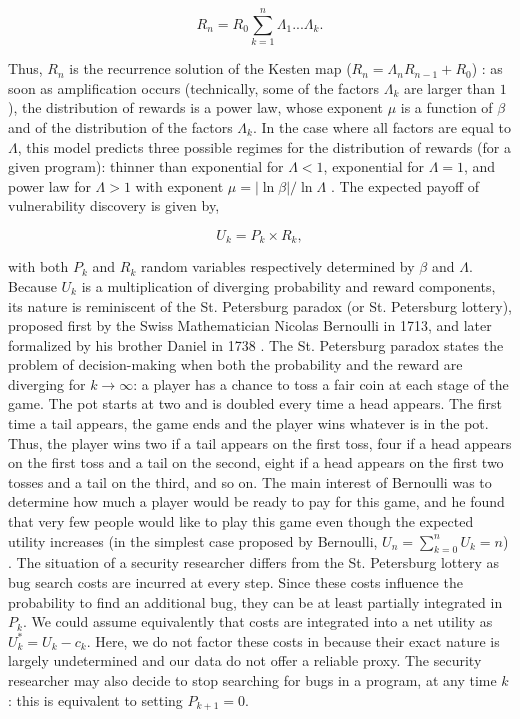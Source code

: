 \begin{equation}
R_{n} = R_{0} \sum_{k=1}^{n} \Lambda_1 ... \Lambda_k.
\end{equation}

Thus, $R_{n}$ is the recurrence solution of the  
Kesten map ($R_{n} = \Lambda_n R_{n-1} +R_0$)
\cite{kesten1973random,sornette1997convergent}:  as soon as amplification occurs (technically, 
some of the factors $\Lambda_k$ are larger than $1$), the distribution
of rewards is a power law, whose exponent $\mu$ is a function of $\beta$
and of the distribution of the factors $\Lambda_k$. In the case where
all factors are equal to $\Lambda$, this model predicts three possible regimes for the distribution of rewards (for a given program): thinner than exponential for $\Lambda < 1$, exponential for $\Lambda = 1$, and power law for $\Lambda > 1$ with exponent $\mu = |\ln \beta|/ \ln \Lambda$ \cite{sornette2013exploring}. The expected payoff of vulnerability discovery is given by,

\begin{equation}
\label{ }
U_k = P_k \times R_k,
\end{equation}

\noindent with both $P_k$ and $R_k$ random variables respectively determined by $\beta$ and $\Lambda$. Because $U_k$ is a multiplication of diverging probability and reward components, its nature is reminiscent of the St. Petersburg paradox (or St. Petersburg lottery), proposed first by the Swiss Mathematician Nicolas Bernoulli in 1713, and later formalized by his brother Daniel in 1738 \cite{bernoulli1954exposition}. The St. Petersburg paradox states the problem of decision-making when both the probability and the reward are diverging for $k \rightarrow \infty$: a player has a chance to toss a fair coin at each stage of the game. The pot starts at two and is doubled every time a head appears. The first time a tail appears, the game ends and the player wins whatever is in the pot. Thus, the player wins two if a tail appears on the first toss, four if a head appears on the first toss and a tail on the second, eight if a head appears on the first two tosses and a tail on the third, and so on. The main interest of Bernoulli was to determine how much a player would be ready to pay for this game, and he found that very few people would like to play this game even though the expected utility increases (in the simplest case proposed by Bernoulli, $U_n = \sum_{k=0}^{n} U_k = n$) \cite{bernoulli1954exposition}. The situation of a security researcher differs from the St. Petersburg lottery as bug search costs are incurred at every step. Since these costs influence the probability to find an additional bug, they can be at least partially integrated in $P_k$. We could assume equivalently that costs are integrated into a net utility as $U^{*}_k = U_k - c_k$. Here, we do not factor these costs in because their exact nature is largely undetermined and our data do not offer a reliable proxy. The security researcher may also decide to stop searching for bugs in a program, at any time $k$: this is equivalent to setting $P_{k+1} = 0$.\\

